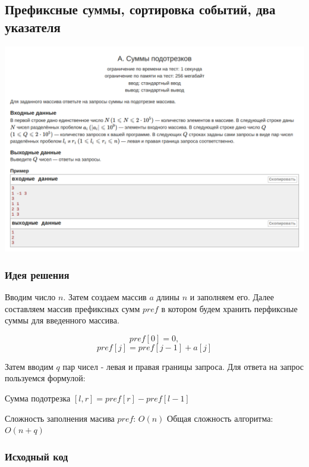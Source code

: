 \subsection*{Префиксные суммы, сортировка событий, два указателя}

\begin{center}
\includegraphics[width=\textwidth]{statements/Contest4A.png}
\end{center}

\subsubsection*{Идея решения}

Вводим число $n$. Затем создаем массив $a$ длины $n$ и заполняем
его.
Далее составляем массив префиксных сумм $pref$ в котором будем хранить перфиксные суммы для введенного массива.

$$pref[0] = 0,$$
$$pref[j] = pref[j - 1] + a[j]$$

Затем вводим $q$ пар чисел - левая и правая границы запроса.
Для ответа на запрос пользуемся формулой:

\begin{center}
Сумма подотрезка $[l, r] = pref[r] - pref[l - 1]$
\end{center}

Сложность заполнения масива $pref$: $O(n)$ \newline
Общая сложность алгоритма: $O(n + q)$

\subsubsection*{Исходный код}



